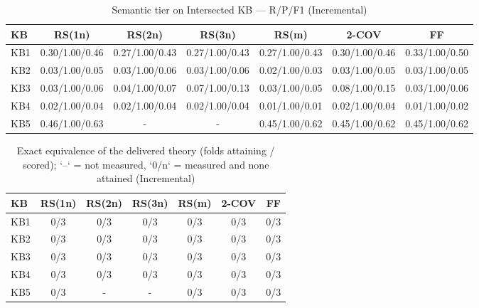 \begin{table}[htbp]
\centering
\caption{Semantic tier on Intersected KB — R/P/F1 (Incremental)}
\label{tab:semantic_prf_incremental}
\begin{tabular}{lcccccc}
\toprule
KB & RS(1n) & RS(2n) & RS(3n) & RS(m) & 2-COV & FF \\
\midrule
KB1 & 0.30/1.00/0.46 & 0.27/1.00/0.43 & 0.27/1.00/0.43 & 0.27/1.00/0.43 & 0.30/1.00/0.46 & 0.33/1.00/0.50 \\
KB2 & 0.03/1.00/0.05 & 0.03/1.00/0.06 & 0.03/1.00/0.06 & 0.02/1.00/0.03 & 0.03/1.00/0.05 & 0.03/1.00/0.05 \\
KB3 & 0.03/1.00/0.06 & 0.04/1.00/0.07 & 0.07/1.00/0.13 & 0.03/1.00/0.05 & 0.08/1.00/0.15 & 0.03/1.00/0.06 \\
KB4 & 0.02/1.00/0.04 & 0.02/1.00/0.04 & 0.02/1.00/0.04 & 0.01/1.00/0.01 & 0.02/1.00/0.04 & 0.01/1.00/0.02 \\
KB5 & 0.46/1.00/0.63 & - & - & 0.45/1.00/0.62 & 0.45/1.00/0.62 & 0.45/1.00/0.62 \\
\bottomrule
\end{tabular}
\end{table}

\begin{table}[htbp]
\centering
\caption{Exact equivalence of the delivered theory (folds attaining / scored); `--` = not measured, `0/n` = measured and none attained (Incremental)}
\label{tab:exact_equiv_incremental}
\begin{tabular}{lcccccc}
\toprule
KB & RS(1n) & RS(2n) & RS(3n) & RS(m) & 2-COV & FF \\
\midrule
KB1 & 0/3 & 0/3 & 0/3 & 0/3 & 0/3 & 0/3 \\
KB2 & 0/3 & 0/3 & 0/3 & 0/3 & 0/3 & 0/3 \\
KB3 & 0/3 & 0/3 & 0/3 & 0/3 & 0/3 & 0/3 \\
KB4 & 0/3 & 0/3 & 0/3 & 0/3 & 0/3 & 0/3 \\
KB5 & 0/3 & - & - & 0/3 & 0/3 & 0/3 \\
\bottomrule
\end{tabular}
\end{table}

